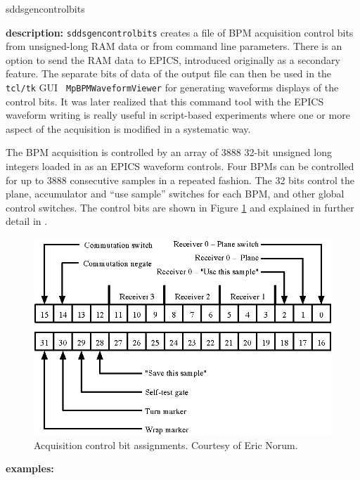 \begin{sddsprog}{sddsgencontrolbits}
\item \textbf{description:}
\verb+sddsgencontrolbits+ creates a file of BPM acquisition control
bits from unsigned-long RAM data or from command line
parameters. There is an option to send the RAM data to EPICS,
introduced originally as a secondary feature. The separate bits of
data of the output file can then be used in the {\tt tcl/tk} GUI {\tt
MpBPMWaveformViewer} for generating waveforms displays of the control
bits. It was later realized that this command tool with the EPICS
waveform writing is really useful in script-based experiments where one
or more aspect of the acquisition is modified in a systematic way.

The BPM acquisition is controlled by an array of 3888 32-bit unsigned
long integers loaded in as an EPICS waveform controls. Four BPMs can
be controlled for up to 3888 consecutive samples in a repeated
fashion.  The 32 bits control the plane, accumulator and ``use
sample'' switches for each BPM, and other global control switches. The
control bits are shown in Figure \ref{fig:acquisitionControlRam} and
explained in further detail in \cite{Norum2007}.

\begin{figure}[htb]
\centering
\includegraphics[width=\textwidth]{acquisitionControlRam.eps}
\caption{Acquisition control bit assignments. Courtesy of Eric Norum.}
\label{fig:acquisitionControlRam}
\end{figure}

\item \textbf{examples:}


\end{sddsprog}
